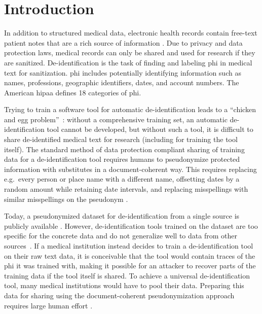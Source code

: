 
\section{Introduction}\label{sec:introduction}
%
In addition to structured medical data, electronic health records contain free-text patient notes that are a rich source of information \citep{jensen2012mining}.
%
Due to privacy and data protection laws, medical records can only be shared and used for research if they are sanitized.
%
De-identification is the task of finding and labeling \ac{phi} in medical text for sanitization.
%
\Ac{phi} includes potentially identifying information such as names, professions, geographic identifiers, dates, and account numbers.
%
The American \ac{hipaa} defines 18 categories of \ac{phi}.




%
Trying to train a software tool for automatic de-identification leads to a ``chicken and egg problem''~\citep{uzuner2007evaluating}: without a comprehensive training set, an automatic de-identification tool cannot be developed, but without such a tool, it is difficult to share de-identified medical text for research (including for training the tool itself).
%
The standard method of data protection compliant sharing of training data for a de-identification tool requires humans to pseudonymize protected information with substitutes in a document-coherent way.
%
This requires replacing e.g.\ every person or place name with a different name, offsetting dates by a random amount while retaining date intervals, and replacing misspellings with similar misspellings on the pseudonym \cite{uzuner2007evaluating}.

%
Today, a pseudonymized dataset for de-identification from a single source is publicly available \citep{stubbs2015annotating}.
%
However, de-identification tools trained on the dataset are too specific for the concrete data and do not generalize well to data from other sources~\citep{stubbs2017identification}.
%
If a medical institution instead decides to train a de-identification tool on their raw text data, it is conceivable that the tool would contain traces of the \ac{phi} it was trained with, making it possible for an attacker to recover parts of the training data if the tool itself is shared.
%
To achieve a universal de-identification tool, many medical institutions would have to pool their data.
%
Preparing this data for sharing using the document-coherent pseudonymization approach requires large human effort \citep{dernoncourt2017identification}.

